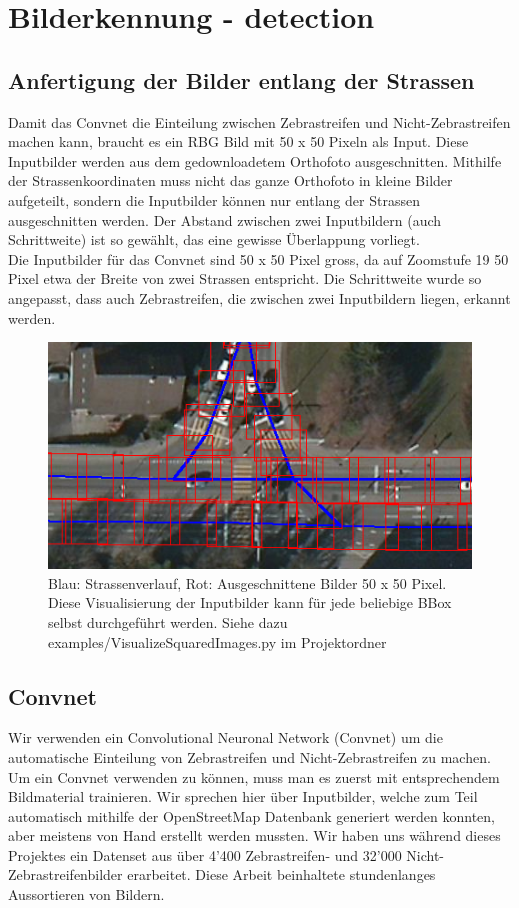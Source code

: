 \section{Bilderkennung - detection}

\subsection{Anfertigung der Bilder entlang der Strassen}
Damit das Convnet die Einteilung zwischen Zebrastreifen und Nicht-Zebrastreifen machen kann, braucht es ein RBG Bild mit 50 x 50 Pixeln als Input. Diese Inputbilder werden aus dem gedownloadetem Orthofoto ausgeschnitten. Mithilfe der Strassenkoordinaten muss nicht das ganze Orthofoto in kleine Bilder aufgeteilt, sondern die Inputbilder können nur entlang der Strassen ausgeschnitten werden. Der Abstand zwischen zwei Inputbildern (auch Schrittweite) ist so gewählt, das eine gewisse Überlappung vorliegt.
\\
Die Inputbilder für das Convnet sind 50 x 50 Pixel gross, da auf Zoomstufe 19 50 Pixel etwa der Breite von zwei Strassen entspricht. Die Schrittweite wurde so angepasst, dass auch Zebrastreifen, die zwischen zwei Inputbildern liegen, erkannt werden.
\\
\begin{figure}[H]
	\centering
	\includegraphics{images/squared_images.png}
	\caption{Blau: Strassenverlauf, Rot: Ausgeschnittene Bilder 50 x 50 Pixel. Diese Visualisierung der Inputbilder kann für jede beliebige BBox selbst durchgeführt werden. Siehe dazu examples/VisualizeSquaredImages.py im Projektordner}
\end{figure}



\subsection{Convnet}
Wir verwenden ein Convolutional Neuronal Network (Convnet) um die automatische Einteilung von Zebrastreifen und Nicht-Zebrastreifen zu machen. Um ein Convnet verwenden zu können, muss man es zuerst mit entsprechendem Bildmaterial trainieren. Wir sprechen hier über Inputbilder, welche zum Teil automatisch mithilfe der OpenStreetMap Datenbank generiert werden konnten, aber meistens von Hand erstellt werden mussten. Wir haben uns während dieses Projektes ein Datenset aus über 4'400 Zebrastreifen- und 32'000 Nicht-Zebrastreifenbilder erarbeitet. Diese Arbeit beinhaltete stundenlanges Aussortieren von Bildern.
\\

